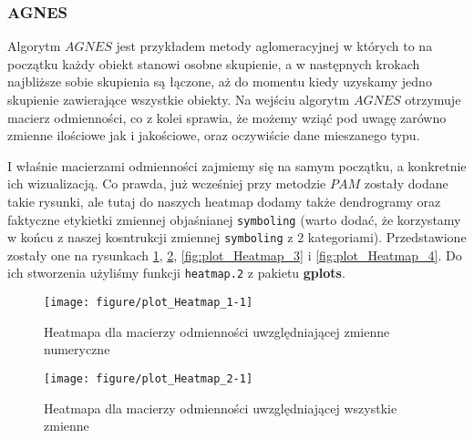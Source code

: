 \documentclass[12pt, a4paper]{article}\usepackage[]{graphicx}\usepackage[]{xcolor}
\makeatletter
\def\maxwidth{ %
  \ifdim\Gin@nat@width>\linewidth
    \linewidth
  \else
    \Gin@nat@width
  \fi
}
\newenvironment{knitrout}{}{} %
\makeatother
\begin{document}
\subsubsection{AGNES}
Algorytm $AGNES$ jest przykładem metody aglomeracyjnej w których to na początku każdy obiekt stanowi osobne skupienie, a w następnych krokach najbliższe sobie skupienia są łączone, aż do momentu kiedy uzyskamy jedno skupienie zawierające wszystkie obiekty. Na wejściu algorytm $AGNES$ otrzymuje macierz odmienności, co z kolei sprawia, że możemy wziąć pod uwagę zarówno zmienne ilościowe jak i jakościowe, oraz oczywiście dane mieszanego typu.
\par I właśnie macierzami odmienności zajmiemy się na samym początku, a konkretnie ich wizualizacją. Co prawda, już wcześniej przy metodzie $PAM$ zostały dodane takie rysunki, ale tutaj do naszych heatmap dodamy także dendrogramy oraz faktyczne etykietki zmiennej objaśnianej \texttt{symboling} (warto dodać, że korzystamy w końcu z naszej kosntrukcji zmiennej \texttt{symboling} z $2$ kategoriami). Przedstawione zostały one na rysunkach \ref{fig:plot_Heatmap_1}, \ref{fig:plot_Heatmap_2}, \ref{fig:plot_Heatmap_3} i \ref{fig:plot_Heatmap_4}. Do ich stworzenia użyliśmy funkcji \texttt{heatmap.2} \cite{heatmap2} z pakietu \textbf{gplots}. 








\begin{knitrout}
\color{fgcolor}\begin{figure}[H]

{\centering \texttt{[image: figure/plot\_Heatmap\_1-1]} 

}

\caption[Heatmapa dla macierzy odmienności uwzględniającej zmienne numeryczne]{Heatmapa dla macierzy odmienności uwzględniającej zmienne numeryczne}\label{fig:plot_Heatmap_1}
\end{figure}

\end{knitrout}

\begin{knitrout}
\color{fgcolor}\begin{figure}[H]

{\centering \texttt{[image: figure/plot\_Heatmap\_2-1]} 

}

\caption[Heatmapa dla macierzy odmienności uwzględniającej wszystkie zmienne]{Heatmapa dla macierzy odmienności uwzględniającej wszystkie zmienne}\label{fig:plot_Heatmap_2}
\end{figure}

\end{knitrout}
\end{document}
